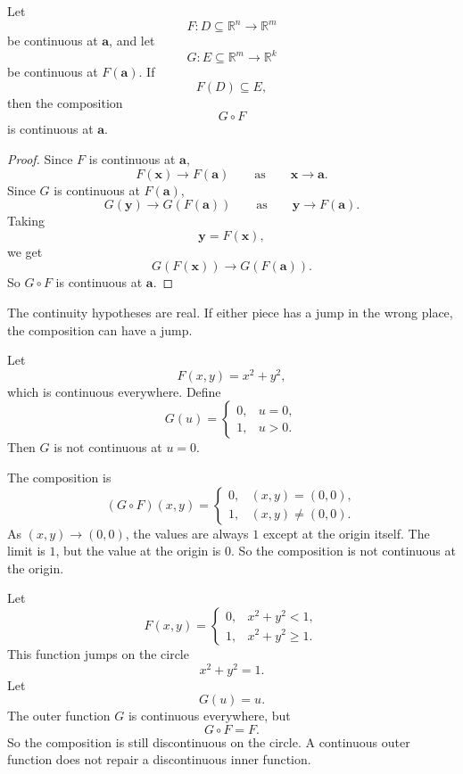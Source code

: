 \begin{theorem}
Let
\[
    F:D\subseteq\mathbb R^n\to\mathbb R^m
\]
be continuous at \(\mathbf a\), and let
\[
    G:E\subseteq\mathbb R^m\to\mathbb R^k
\]
be continuous at \(F(\mathbf a)\).  If
\[
    F(D)\subseteq E,
\]
then the composition
\[
    G\circ F
\]
is continuous at \(\mathbf a\).
\end{theorem}

\begin{proof}
Since \(F\) is continuous at \(\mathbf a\),
\[
    F(\mathbf x)\to F(\mathbf a)
    \qquad\text{as}\qquad
    \mathbf x\to\mathbf a.
\]
Since \(G\) is continuous at \(F(\mathbf a)\),
\[
    G(\mathbf y)\to G(F(\mathbf a))
    \qquad\text{as}\qquad
    \mathbf y\to F(\mathbf a).
\]
Taking
\[
    \mathbf y=F(\mathbf x),
\]
we get
\[
    G(F(\mathbf x))\to G(F(\mathbf a)).
\]
So \(G\circ F\) is continuous at \(\mathbf a\).
\end{proof}

The continuity hypotheses are real.  If either piece has a jump in the wrong place,
the composition can have a jump.

\begin{example}
Let
\[
    F(x,y)=x^2+y^2,
\]
which is continuous everywhere.  Define
\[
    G(u)=
    \begin{cases}
    0, & u=0,\\
    1, & u>0.
    \end{cases}
\]
Then \(G\) is not continuous at \(u=0\).

The composition is
\[
    (G\circ F)(x,y)=
    \begin{cases}
    0, & (x,y)=(0,0),\\
    1, & (x,y)\ne(0,0).
    \end{cases}
\]
As \((x,y)\to(0,0)\), the values are always \(1\) except at the origin itself.  The
limit is \(1\), but the value at the origin is \(0\).  So the composition is not continuous
at the origin.
\end{example}

\begin{example}
Let
\[
    F(x,y)=
    \begin{cases}
    0, & x^2+y^2<1,\\
    1, & x^2+y^2\ge1.
    \end{cases}
\]
This function jumps on the circle
\[
    x^2+y^2=1.
\]
Let
\[
    G(u)=u.
\]
The outer function \(G\) is continuous everywhere, but
\[
    G\circ F=F.
\]
So the composition is still discontinuous on the circle.  A continuous outer function
does not repair a discontinuous inner function.
\end{example}

